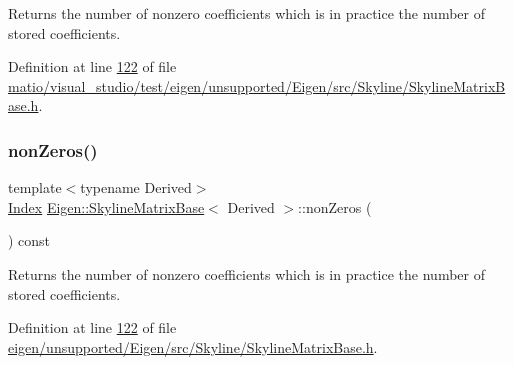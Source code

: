 \begin{DoxyReturn}{Returns}
the number of nonzero coefficients which is in practice the number of stored coefficients. 
\end{DoxyReturn}


Definition at line \hyperlink{matio_2visual__studio_2test_2eigen_2unsupported_2_eigen_2src_2_skyline_2_skyline_matrix_base_8h_source_l00122}{122} of file \hyperlink{matio_2visual__studio_2test_2eigen_2unsupported_2_eigen_2src_2_skyline_2_skyline_matrix_base_8h_source}{matio/visual\+\_\+studio/test/eigen/unsupported/\+Eigen/src/\+Skyline/\+Skyline\+Matrix\+Base.\+h}.

\mbox{\label{class_eigen_1_1_skyline_matrix_base_aaeda265186dd626052df8580779b7460}} 
\subsubsection{\texorpdfstring{non\+Zeros()}{nonZeros()}\hspace{0.1cm}{\footnotesize\ttfamily [2/2]}}
{\footnotesize\ttfamily template$<$typename Derived$>$ \\
\hyperlink{group___core___module_a554f30542cc2316add4b1ea0a492ff02}{Index} \hyperlink{class_eigen_1_1_skyline_matrix_base}{Eigen\+::\+Skyline\+Matrix\+Base}$<$ Derived $>$\+::non\+Zeros (\begin{DoxyParamCaption}{ }\end{DoxyParamCaption}) const\hspace{0.3cm}{\ttfamily [inline]}}

\begin{DoxyReturn}{Returns}
the number of nonzero coefficients which is in practice the number of stored coefficients. 
\end{DoxyReturn}


Definition at line \hyperlink{eigen_2unsupported_2_eigen_2src_2_skyline_2_skyline_matrix_base_8h_source_l00122}{122} of file \hyperlink{eigen_2unsupported_2_eigen_2src_2_skyline_2_skyline_matrix_base_8h_source}{eigen/unsupported/\+Eigen/src/\+Skyline/\+Skyline\+Matrix\+Base.\+h}.

\mbox{\label{class_eigen_1_1_skyline_matrix_base_a63cc4a263d32a8a225e4a42e891b8ac0}} 
